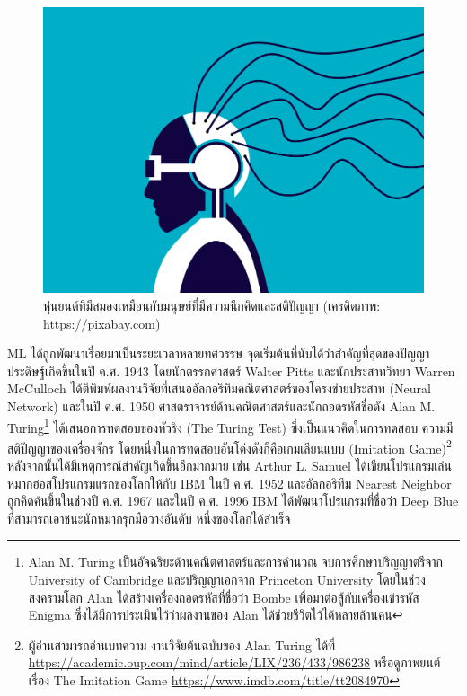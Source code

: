 \begin{figure}[htbp]
    \centering
    \includegraphics[width=0.8\linewidth]{fig/cyborg.png}
    \caption{หุ่นยนต์ที่มีสมองเหมือนกับมนุษย์ที่มีความนึกคิดและสติปัญญา (เครดิตภาพ: https://pixabay.com)}
    \label{fig:cyborg}
\end{figure}

ML ได้ถูกพัฒนาเรื่อยมาเป็นระยะเวลาหลายทศวรรษ จุดเริ่มต้นที่นับได้ว่าสำคัญที่สุดของปัญญาประดิษฐ์เกิดขึ้นในปี ค.ศ. 1943 โดยนักตรรกศาสตร์
Walter Pitts และนักประสาทวิทยา Warren McCulloch ได้ตีพิมพ์ผลงานวิจัยที่เสนออัลกอริทึมคณิตศาสตร์ของโครงข่ายประสาท (Neural 
Network) และในปี ค.ศ. 1950 ศาสตราจารย์ด้านคณิตศาสตร์และนักถอดรหัสชื่อดัง Alan M. Turing\footnote{Alan M. Turing 
เป็นอัจฉริยะด้านคณิตศาสตร์และการคำนวณ จบการศึกษาปริญญาตรีจาก University of Cambridge และปริญญาเอกจาก Princeton University 
โดยในช่วงสงครามโลก Alan ได้สร้างเครื่องถอดรหัสที่ชื่อว่า Bombe เพื่อมาต่อสู้กับเครื่องเข้ารหัส Enigma ซึ่งได้มีการประเมินไว้ว่าผลงานของ Alan 
ได้ช่วยชีวิตไว้ได้หลายล้านคน} ได้เสนอการทดสอบของทัวริง (The Turing Test)\autocite{turing1950} ซึ่งเป็นแนวคิดในการทดสอบ%
ความมีสติปัญญาของเครื่องจักร โดยหนึ่งในการทดสอบอันโด่งดังก็คือเกมเลียนแบบ (Imitation Game)\footnote{ผู้อ่านสามารถอ่านบทความ%
งานวิจัยต้นฉบับของ Alan Turing ได้ที่ \url{https://academic.oup.com/mind/article/LIX/236/433/986238} หรือดูภาพยนต์เรื่อง 
The Imitation Game \url{https://www.imdb.com/title/tt2084970}} หลังจากนั้นได้มีเหตุการณ์สำคัญเกิดขึ้นอีกมากมาย เช่น 
Arthur L. Samuel ได้เขียนโปรแกรมเล่นหมากฮอสโปรแกรมแรกของโลกให้กับ IBM ในปี ค.ศ. 1952 และอัลกอริทึม Nearest Neighbor 
ถูกคิดค้นขึ้นในช่วงปี ค.ศ. 1967 และในปี ค.ศ. 1996 IBM ได้พัฒนาโปรแกรมที่ชื่อว่า Deep Blue ที่สามารถเอาชนะนักหมากรุกมือวางอันดับ%
หนึ่งของโลกได้สำเร็จ

